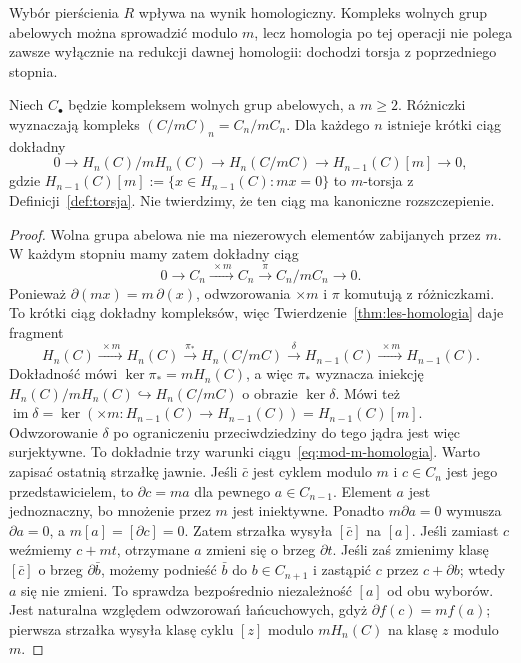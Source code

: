 Wybór pierścienia $R$ wpływa na
wynik homologiczny. Kompleks
wolnych grup abelowych
można sprowadzić modulo $m$,
lecz homologia po tej operacji
nie polega zawsze wyłącznie
na redukcji dawnej homologii:
dochodzi torsja z poprzedniego stopnia.

\begin{twierdzenie}
\label{thm:mod-m-homologia}
Niech $C_\bullet$ będzie kompleksem
wolnych grup abelowych, a $m\geq2$.
Różniczki wyznaczają kompleks
$(C/mC)_n=C_n/mC_n$. Dla każdego
$n$ istnieje krótki ciąg dokładny
\begin{equation}\label{eq:mod-m-homologia}
 0\longrightarrow H_n(C)/mH_n(C)
 \longrightarrow H_n(C/mC)
 \longrightarrow H_{n-1}(C)[m]
 \longrightarrow0,
\end{equation}
gdzie $H_{n-1}(C)[m]:=
\{x\in H_{n-1}(C):mx=0\}$
to $m$-torsja z Definicji~\ref{def:torsja}.
Nie twierdzimy, że ten ciąg ma
kanoniczne rozszczepienie.
\end{twierdzenie}
\begin{proof}
Wolna grupa abelowa nie ma
niezerowych elementów zabijanych
przez $m$. W każdym stopniu mamy
zatem dokładny ciąg
\[
 0\to C_n\xrightarrow{\ \times m\ }C_n
 \xrightarrow{\ \pi\ }C_n/mC_n\to0.
\]
Ponieważ $\partial(mx)=m\,\partial(x)$,
odwzorowania $\times m$ i $\pi$
komutują z różniczkami.
To krótki ciąg dokładny
kompleksów, więc
Twierdzenie~\ref{thm:les-homologia}
daje fragment
\[
 H_n(C)\xrightarrow{\ \times m\ }H_n(C)
 \xrightarrow{\ \pi_*\ }H_n(C/mC)
 \xrightarrow{\ \delta\ }H_{n-1}(C)
 \xrightarrow{\ \times m\ }H_{n-1}(C).
\]
Dokładność mówi
$\ker\pi_*=mH_n(C)$, a więc
$\pi_*$ wyznacza iniekcję
$H_n(C)/mH_n(C)\hookrightarrow H_n(C/mC)$
o obrazie $\ker\delta$.
Mówi też
$\operatorname{im}\delta
=\ker(\times m:H_{n-1}(C)\to H_{n-1}(C))
=H_{n-1}(C)[m]$.
Odwzorowanie $\delta$ po ograniczeniu
przeciwdziedziny do tego jądra
jest więc surjektywne.
To dokładnie trzy warunki
ciągu~\eqref{eq:mod-m-homologia}.
Warto zapisać ostatnią strzałkę jawnie. Jeśli $\bar c$ jest cyklem
modulo $m$ i $c\in C_n$ jest jego przedstawicielem, to
$\partial c=ma$ dla pewnego $a\in C_{n-1}$.
Element $a$ jest jednoznaczny, bo mnożenie przez $m$ jest iniektywne.
Ponadto $m\partial a=0$ wymusza $\partial a=0$,
a $m[a]=[\partial c]=0$. Zatem strzałka wysyła $[\bar c]$ na $[a]$.
Jeśli zamiast $c$ weźmiemy $c+mt$, otrzymane $a$ zmieni się
o brzeg $\partial t$. Jeśli zaś zmienimy klasę $[\bar c]$
o brzeg $\partial\bar b$, możemy podnieść $\bar b$ do $b\in C_{n+1}$
i zastąpić $c$ przez $c+\partial b$; wtedy $a$ się nie zmieni.
To sprawdza bezpośrednio niezależność $[a]$ od obu wyborów.
Jest naturalna względem odwzorowań łańcuchowych, gdyż
$\partial f(c)=mf(a)$; pierwsza strzałka wysyła klasę cyklu
$[z]$ modulo $mH_n(C)$ na klasę $z$ modulo $m$.
\end{proof}

